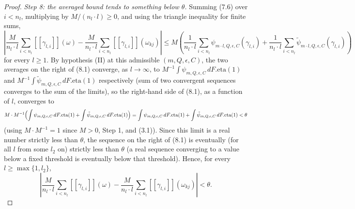 \begin{proof}
  \emph{Step 8: the averaged bound tends to something below $\theta$.} Summing (7.6) over
  $i<n_l$, multiplying by $M/(n_l\cdot l)\ge0$, and using the triangle inequality for finite sums,
  \[
    \left|\frac{M}{n_l\cdot l}\sum_{i<n_l}[[\gamma_{l,i}]](\omega)
      - \frac{M}{n_l\cdot l}\sum_{i<n_l}[[\gamma_{l,i}]](\omega_{kj})\right|
    \le M\left(\frac{1}{n_l\cdot l}\sum_{i<n_l}\psi_{m\cdot l,Q,\epsilon,C}(\gamma_{l,i})
      + \frac{1}{n_l\cdot l}\sum_{i<n_l}\tilde\psi_{m\cdot l,Q,\epsilon,C}(\gamma_{l,i})\right)
    \tag{8.1}
  \]
  for every $l\ge1$. By hypothesis (II) at this admissible $(m,Q,\epsilon,C)$, the two averages on
  the right of (8.1) converge, as $l\to\infty$, to $M^{-1}\int\psi_{m,Q,\epsilon,C}\,dF.\mathrm{eta}(1)$
  and $M^{-1}\int\tilde\psi_{m,Q,\epsilon,C}\,dF.\mathrm{eta}(1)$ respectively (sum of two convergent
  sequences converges to the sum of the limits), so the right-hand side of (8.1), as a function of
  $l$, converges to
  \[
    M\cdot M^{-1}\Bigl(\int\psi_{m,Q,\epsilon,C}\,dF.\mathrm{eta}(1)
      + \int\tilde\psi_{m,Q,\epsilon,C}\,dF.\mathrm{eta}(1)\Bigr)
    = \int\psi_{m,Q,\epsilon,C}\,dF.\mathrm{eta}(1) + \int\tilde\psi_{m,Q,\epsilon,C}\,dF.\mathrm{eta}(1)
    < \theta
  \]
  (using $M\cdot M^{-1}=1$ since $M>0$, Step 1, and (3.1)). Since this limit is a real number
  strictly less than $\theta$, the sequence on the right of (8.1) is eventually (for all $l$ from
  some $l_2$ on) strictly less than $\theta$ (a real sequence converging to a value below a fixed
  threshold is eventually below that threshold). Hence, for every $l\ge\max\{1,l_2\}$,
  \[
    \left|\frac{M}{n_l\cdot l}\sum_{i<n_l}[[\gamma_{l,i}]](\omega)
      - \frac{M}{n_l\cdot l}\sum_{i<n_l}[[\gamma_{l,i}]](\omega_{kj})\right|
    < \theta
    . \tag{8.2}
  \]


\end{proof}
